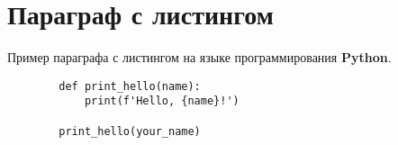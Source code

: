 \section{Параграф с листингом}

Пример параграфа с листингом на языке программирования \textbf{Python}.


\begin{tcolorbox}[colback=JournalCodeBlock,colframe=JournalCodeBlock]
    \begin{verbatim}
        def print_hello(name):
            print(f'Hello, {name}!')
    
        print_hello(your_name)
    \end{verbatim}
\end{tcolorbox}